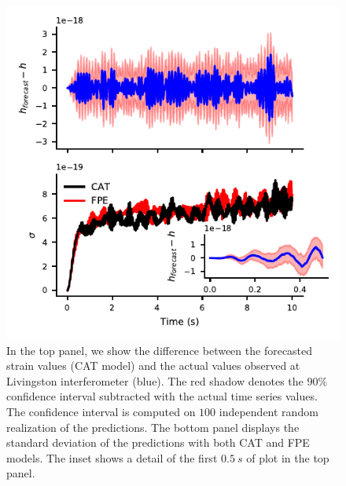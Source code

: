 \documentclass[twocolumn,showpacs,preprintnumbers,nofootinbib,prd,
superscriptaddress,10pt]{revtex4-1}
\begin{document}
\begin{figure}
	\caption{In the top panel, we show the difference between the forecasted strain values (CAT model) and the actual values observed at Livingston interferometer (blue). The red shadow denotes the $90\%$ confidence interval subtracted with the actual time series values. The confidence interval is computed on  $100$ independent random realization of the predictions.
	The bottom panel displays the standard deviation of the predictions with both CAT and FPE models. The inset shows a detail of the first $\SI{0.5}{s}$ of plot in the top panel.
	}
	\label{fig:LIGO_forecast}
	\includegraphics{Images/forecast_LIGO/forecast_accuracy.pdf}
\end{figure}
\end{document}
